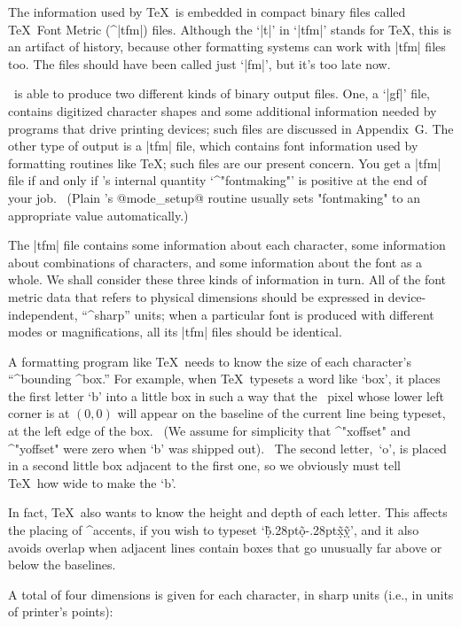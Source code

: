 The information used by \TeX\ is embedded in compact binary files called
\TeX\ Font Metric (^|tfm|) files. Although the `|t|' in `|tfm|' stands
for \TeX, this is an artifact of history, because other formatting systems
can work with |tfm| files too. The files should have been called just `|fm|',
but it's too late now.

\MF\ is able to produce two different kinds of binary output files.
One, a `|gf|' file, contains digitized character shapes and some additional
information needed by programs that drive printing devices; such files
are discussed in Appendix~G\null. The other type of output is a |tfm| file,
which contains font information used by formatting routines like \TeX;
such files are our present concern. You get a |tfm| file if and only
if \MF's internal quantity `^"fontmaking"' is positive at the end
of your job. \ (Plain \MF's @mode\_setup@ routine usually sets
"fontmaking" to an appropriate value automatically.)

\medskip\ninepoint
The |tfm| file contains some information about each character, some
information about combinations of characters, and some information
about the font as a whole. We shall consider these three kinds
of information in turn. All of the font metric data that refers to
physical dimensions should be expressed in device-independent,
``^{sharp}'' units; when a particular font is produced with different
modes or magnifications, all its |tfm| files should be identical.

A formatting program like \TeX\ needs to know the size of each character's
``^{bounding} ^{box}.'' For example, when \TeX\ typesets a word like
`box', it places the first letter `b' into a little box in such a way that
the \MF\ pixel whose lower left corner is at $(0,0)$ will appear
on the baseline of the current line being typeset, at the left edge
of the box. \ (We assume for simplicity that ^"xoffset" and ^"yoffset"
were zero when `b' was shipped out). \ The second letter,~`o', is placed
in a second little box adjacent to the first one, so we obviously must tell
\TeX\ how wide to make the `b'.

In fact, \TeX\ also wants to know the height and depth of each letter.
This affects the placing of ^{accents}, if you wish to typeset
`\d{\~b}\kern.28pt\d{\~o}\kern-.28pt\d{\~x}\d{\~y}', and it also
avoids overlap when adjacent lines contain boxes that go unusually
far above or below the baselines.

A total of four dimensions is given for each character, in sharp
units (i.e., in units of printer's points):

